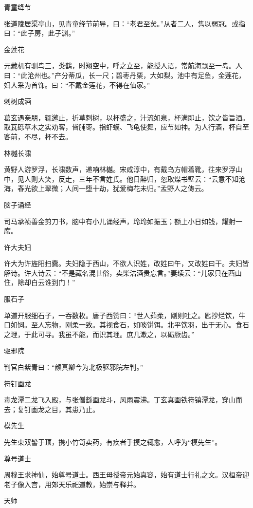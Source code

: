 \documentclass[a4paper,12pt,UTF8,twoside]{ctexbook}
\begin{document}
    青童绛节
    
    张道陵居渠亭山，见青童绛节前导，曰：“老君至矣。”从者二人，隽以弱冠。或指曰：“此子房，此子渊。”
    
    金莲花
    
    元藏机有驯鸟三，类鹤，时翔空中，呼之立至，能授人语，常航海飘至一岛。人曰：“此沧州也。”产分蒂瓜，长一尺；碧枣丹栗，大如梨。池中有足鱼，金莲花，妇人采为首饰。曰：“不戴金莲花，不得在仙家。”
    
    刺树成酒
    
    葛玄遇亲朋，辄邀止，折草刺树，以杯盛之，汁流如泉，杯满即止，饮之皆旨酒。取瓦砾草木之实劝客，皆脯枣。指虾蟆、飞龟使舞，应节如神。为人行酒，杯自至客前，不尽，杯不去。
    
    林樾长啸
    
    黄野人游罗浮，长啸数声，递响林樾。宋咸淳中，有戴乌方帽着靴，往来罗浮山中，见人则大笑，反走，三年不言姓氏。他日醉归，忽取煤书壁云：“云意不知沧海，春光欲上翠微；人间一堕十劫，犹爱梅花未归。”孟野人之俦云。
    
    脑子诵经
    
    司马承祯善金剪刀书，脑中有小儿诵经声，玲玲如振玉；额上小日如钱，耀射一席。
    
    许大夫妇
    
    许大为许旌阳扫爨。夫妇隐于西山，不欲人识姓，改姓曰午，又改姓曰干。夫妇皆解诗。许大诗云：“不是藏名混世俗，卖柴沽酒贵忘言。”妻续云：“儿家只在西山住，除却白云谁到门！”
    
    服石子
    
    单道开服细石子，一吞数枚。唐子西赞曰：“世人茹柔，刚则吐之。匙抄烂饮，牛口如饲。至人忘物，刚柔一致。其视食石，如啖饼饵。北平饮羽，出于无心。食石之理，于此可寻。我虽不能，而识其理。庶几漱之，以砺厥齿。”
    
    驱邪院
    
    判官白紫青曰：“颜真卿今为北极驱邪院左判。”
    
    符钉画龙
    
    毒龙潭二龙飞入殿，与张僧繇画龙斗，风雨震沸。丁玄真画铁符镇潭龙，穿山而去；复钉画龙之目，其患乃止。
    
    模先生
    
    先生束双髻于顶，携小竹笥卖药，有疾者手摸之辄愈，人呼为“模先生”。
    
    尊号道士
    
    周穆王求神仙，始尊号道士。西王母授帝元始真容，始有道士行礼之文。汉桓帝迎老子像入宫，用郊天乐祀道教，始崇与释并。
    
    天师
    
\end{document}
